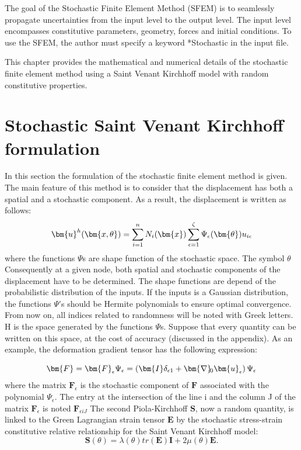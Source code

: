 \documentclass[oneside,11pt,times]{book}
\begin{document}
The goal of the Stochastic Finite Element Method (SFEM) is to seamlessly propagate uncertainties from the input level to the output level. The input level encompasses constitutive parameters, geometry, forces and initial conditions. To use the SFEM, the author must specify a keyword *Stochastic in the input file.

This chapter provides the mathematical and numerical details of the stochastic finite element method using a Saint Venant Kirchhoff model with random constitutive properties.

\section{Stochastic Saint Venant Kirchhoff formulation}
In this section the formulation of the stochastic finite element method is given. The main feature of this method is to consider that the displacement has both a spatial and a stochastic component. As a result, the displacement is written as follows:
\begin{equation}\label{eq:2-stochastic}
\centering
\bm{u}^{h}(\bm{x,\theta})=\sum\limits_{i=1}^{n} N_i(\bm{x}) \sum\limits_{\epsilon=1}^{\zeta}\Psi_\epsilon(\bm{\theta})u_{i \epsilon}
\end{equation}
where the functions $\Psi$s are shape function of the stochastic space. The symbol $\theta$ Consequently at a given node, both spatial and stochastic components of the displacement have to be determined. The shape functions are depend of the probabilistic distribution of the inputs. If the inputs is a Gaussian distribution, the functions $\Psi$'s should be Hermite polynomials to ensure optimal convergence. From now on, all indices related to randomness will be noted with Greek letters. H is the space generated by the functions $\Psi$s. Suppose that every quantity can be written on this space, at the cost of accuracy (discussed in the appendix). As an example, the deformation gradient tensor has the following expression:

\begin{equation}\label{eq:2-stochastic}
\centering
\bm{F} = \bm{F}_{\epsilon}\Psi_\epsilon = \left(\bm{I}\delta_{\epsilon1} + \bm{\nabla}\!_0 \bm{u}_{\epsilon}\right) \Psi_\epsilon
\end{equation}
where the matrix $\bm{F}_{\epsilon}$ is the stochastic component of $\bm{F}$ associated with the polynomial $\Psi_{\epsilon}$. The entry at the intersection of the line i and the column J of the matrix $\bm{F}_{\epsilon}$ is noted $\bm{F}_{\epsilon iJ}$
The second Piola-Kirchhoff $\bm{S}$, now a random quantity, is linked to the Green Lagrangian strain tensor $\bm{E}$ by the stochastic stress-strain constitutive relative relationship for the Saint Venant Kirchhoff model:
\begin{equation}
    \bm{S}(\theta) = \lambda(\theta) tr(\bm{E})\bm{I} + 2\mu(\theta) \bm{E}.
\end{equation}
\end{document}
